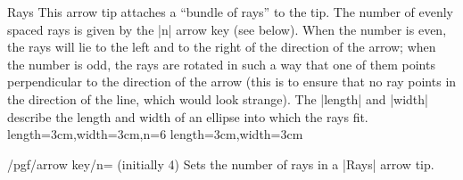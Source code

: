 \begin{arrowtip}{Rays}
  {
    This arrow tip attaches a ``bundle of rays'' to the tip. The
    number of evenly spaced rays is given by the |n| arrow key (see
    below). When the number is even, the rays will lie to the left and
    to the right of the direction of the arrow; when the number is
    odd, the rays are rotated in such a way that one of them points
    perpendicular to the direction of the arrow (this is to ensure
    that no ray points in the direction of the line, which would look
    strange). The |length| and |width| describe the length and width
    of an ellipse into which the rays fit.
  }
  {length=3cm,width=3cm,n=6}
  {length=3cm,width=3cm}
  
  \begin{arrowexamples}
    \arrowexample[]
    \arrowexampledup[sep]
    \arrowexampledupdot[sep]
    \arrowexample[round]
    \arrowexample[n=2]
    \arrowexample[n=3]
    \arrowexample[n=4]
    \arrowexample[n=5]
    \arrowexample[n=6]
    \arrowexample[n=7]
    \arrowexample[n=8]
    \arrowexample[n=9]
    \arrowexample[slant=.3]
    \arrowexample[left]
    \arrowexample[right]
    \arrowexample[left,n=5]
    \arrowexample[right,n=5]
    \arrowexample[red]
  \end{arrowexamples}
\end{arrowtip}
\begin{key}{/pgf/arrow key/n= (initially 4)}
  Sets the number of rays in a |Rays| arrow tip.
\end{key}


\endinput


